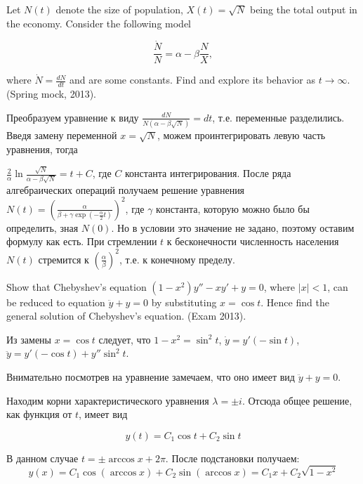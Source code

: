 \begin{problem}
Let $N(t)$ denote the size of population, $X(t)=\sqrt{N} $ being the total output in the economy. Consider the following model

\[\frac{\dot{N}}{N} =\alpha -\beta \frac{N}{X} ,\] 

where $\dot{N}=\frac{dN}{dt} $ and  are some constants. Find  and explore its behavior as $t\to \infty $. (Spring mock, 2013).
\end{problem}


\begin{solution}
Преобразуем уравнение к виду $\frac{dN}{N(\alpha -\beta \sqrt{N} )} =dt$, т.е. переменные разделились. Введя замену переменной $x=\sqrt{N} $, можем проинтегрировать левую часть уравнения, тогда

$\frac{2}{\alpha } \ln \frac{\sqrt{N} }{\alpha -\beta \sqrt{N} } =t+C$, где $C$ константа интегрирования. После ряда алгебраических операций получаем решение уравнения $N(t)=\left(\frac{\alpha }{\beta +\gamma \exp (-\frac{\alpha }{2} t)} \right)^{2} $, где $\gamma $ константа, которую можно было бы определить, зная $N(0)$. Но в условии это значение не задано, поэтому оставим формулу как есть. При стремлении $t$ к бесконечности численность населения $N(t)$ стремится к $\left(\frac{\alpha }{\beta } \right)^{2} $, т.е. к конечному пределу.
\end{solution}


\begin{problem}
Show that Chebyshev's equation $(1-x^{2} )y''-xy'+y=0$, where $\left|x\right|<1$, can be reduced to equation $\ddot{y}+y=0$ by substituting $x=\cos t$. Hence find the general solution of  Chebyshev's equation. (Exam 2013).
\end{problem}

\begin{solution}
Из замены $x=\cos t$ следует, что $1-x^2=\sin^2 t$, $\dot{y}=y'(-\sin t)$, $\ddot{y}=y'(-\cos t )+y'' \sin^2 t$. 

Внимательно посмотрев на уравнение замечаем, что оно имеет
вид $\ddot{y}+y=0$.

Находим корни характеристического уравнения $\lambda=\pm i$. Отсюда общее решение, как функция от $t$, имеет вид

\[
y(t)=C_1 \cos t + C_2 \sin t
\]

В данном случае $t=\pm \arccos x + 2\pi$. После подстановки получаем:
\[
y(x)=C_1 \cos(\arccos x) + C_2 \sin (\arccos x)= C_1 x + C_2 \sqrt{1-x^2}
\]
\end{solution}



